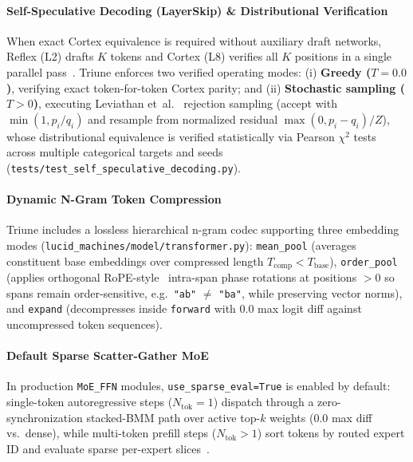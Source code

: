 \documentclass[10pt,twocolumn,letterpaper]{article}
\begin{document}
\paragraph{Self-Speculative Decoding (LayerSkip) \& Distributional Verification} When exact Cortex equivalence is required without auxiliary draft networks, Reflex (L2) drafts $K$ tokens and Cortex (L8) verifies all $K$ positions in a single parallel pass~\cite{elhoushi2024layerskip}. Triune enforces two verified operating modes: (i) \textbf{Greedy ($T=0.0$)}, verifying exact token-for-token Cortex parity; and (ii) \textbf{Stochastic sampling ($T>0$)}, executing Leviathan et~al.~\cite{leviathan2023fast} rejection sampling (accept with $\min(1, p_i/q_i)$ and resample from normalized residual $\max(0, p_i - q_i)/Z$), whose distributional equivalence is verified statistically via Pearson $\chi^2$ tests across multiple categorical targets and seeds (\texttt{tests/test\_self\_speculative\_decoding.py}).

\paragraph{Dynamic N-Gram Token Compression} Triune includes a lossless hierarchical n-gram codec supporting three embedding modes (\texttt{lucid\_machines/model/transformer.py}): \texttt{mean\_pool} (averages constituent base embeddings over compressed length $T_{\text{comp}} < T_{\text{base}}$), \texttt{order\_pool} (applies orthogonal RoPE-style~\cite{su2024roformer} intra-span phase rotations at positions $>0$ so spans remain order-sensitive, e.g.\ \texttt{"ab"} $\neq$ \texttt{"ba"}, while preserving vector norms), and \texttt{expand} (decompresses inside \texttt{forward} with $0.0$ max logit diff against uncompressed token sequences).

\paragraph{Default Sparse Scatter-Gather MoE} In production \texttt{MoE\_FFN} modules, \texttt{use\_sparse\_eval=True} is enabled by default: single-token autoregressive steps ($N_{\text{tok}}=1$) dispatch through a zero-synchronization stacked-BMM path over active top-$k$ weights ($0.0$ max diff vs.\ dense), while multi-token prefill steps ($N_{\text{tok}}>1$) sort tokens by routed expert ID and evaluate sparse per-expert slices~\cite{shazeer2017outrageously,fedus2022switch,gale2023megablocks}.
\end{document}
